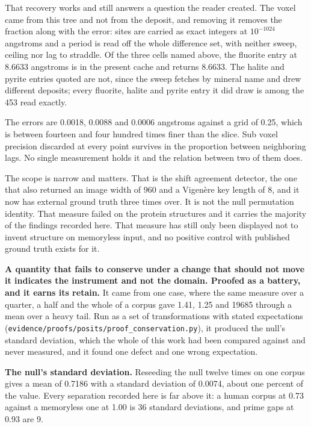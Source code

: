 That recovery works and still answers a question the reader created. The voxel came from this tree and not from the deposit, and removing it removes the fraction along with the error: sites are carried as exact integers at \(10^{-1024}\) angstroms and a period is read off the whole difference set, with neither sweep, ceiling nor lag to straddle. Of the three cells named above, the fluorite entry at 8.6633 angstroms is in the present cache and returns 8.6633. The halite and pyrite entries quoted are not, since the sweep fetches by mineral name and drew different deposits; every fluorite, halite and pyrite entry it did draw is among the 453 read exactly.

The errors are 0.0018, 0.0088 and 0.0006 angstroms against a grid of 0.25, which is between fourteen and four hundred times finer than the slice. Sub voxel precision discarded at every point survives in the proportion between neighboring lags. No single measurement holds it and the relation between two of them does.

The scope is narrow and matters. That is the shift agreement detector, the one that also returned an image width of 960 and a Vigenère key length of 8, and it now has external ground truth three times over. It is not the null permutation identity. That measure failed on the protein structures and it carries the majority of the findings recorded here. That measure has still only been displayed not to invent structure on memoryless input, and no positive control with published ground truth exists for it.

\textbf{A quantity that fails to conserve under a change that should not move it indicates the instrument and not the domain. Proofed as a battery, and it earns its retain.} It came from one case, where the same measure over a quarter, a half and the whole of a corpus gave 1.41, 1.25 and 19685 through a mean over a heavy tail. Run as a set of transformations with stated expectations (\texttt{evidence/\allowbreak{}proofs/\allowbreak{}posits/\allowbreak{}proof\_\allowbreak{}conservation.\allowbreak{}py}), it produced the null's standard deviation, which the whole of this work had been compared against and never measured, and it found one defect and one wrong expectation.

\textbf{The null's standard deviation.} Reseeding the null twelve times on one corpus gives a mean of 0.7186 with a standard deviation of 0.0074, about one percent of the value. Every separation recorded here is far above it: a human corpus at 0.73 against a memoryless one at 1.00 is 36 standard deviations, and prime gaps at 0.93 are 9.

